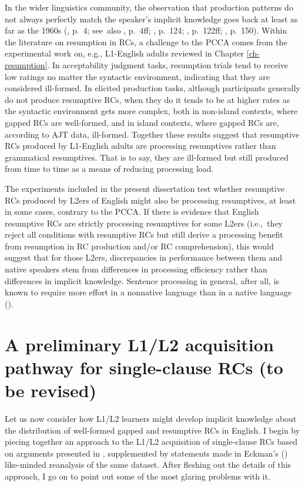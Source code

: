 In the wider linguistics community, the observation that production patterns do not always perfectly match the speaker's implicit knowledge goes back at least as far as the 1960s (\cite{chomsky1965}, p.~4; see~also \cite{kim2016}, p.~4ff; \cite{lust2006}, p.~124; \cite{schwartz1986}, p.~122ff; \cite{schwartz1993}, p.~150). Within the literature on resumption in RCs, a challenge to the PCCA comes from the experimental work on, e.g., L1-English adults reviewed in Chapter \ref{ch-resumption}. In acceptability judgment tasks, resumption trials tend to receive low ratings no matter the syntactic environment, indicating that they are considered ill-formed. In elicited production tasks, although participants generally do not produce resumptive RCs, when they do it tends to be at higher rates as the syntactic environment gets more complex, both in non-island contexts, where gapped RCs are well-formed, and in island contexts, where gapped RCs are, according to AJT data, ill-formed. Together these results suggest that resumptive RCs produced by L1-English adults are processing resumptives rather than grammatical resumptives. That is to say, they are ill-formed but still produced from time to time as a means of reducing processing load. 

The experiments included in the present dissertation test whether resumptive RCs produced by L2ers of English might also be processing resumptives, at least in some cases, contrary to the PCCA. If there is evidence that English resumptive RCs are strictly processing resumptives for some L2ers (i.e.,~they reject all conditions with resumptive RCs but still derive a processing benefit from resumption in RC production and/or RC comprehension), this would suggest that for those L2ers, discrepancies in performance between them and native speakers stem from differences in processing efficiency rather than differences in implicit knowledge. Sentence processing in general, after all, is known to require more effort in a nonnative language than in a native language (\cite{hopp2014,kilborn1992}). 

\section{A preliminary L1/L2 acquisition pathway for single-clause RCs (to be revised)}\label{acq-preliminary}

Let us now consider how L1/L2 learners might develop implicit knowledge about the distribution of well-formed gapped and resumptive RCs in English. I begin by piecing together an approach to the L1/L2 acquisition of single-clause RCs based on arguments presented in \textcite{hyltenstam1984,hyltenstam1990}, supplemented by statements made in Eckman's (\citeyear{eckman2004}) like-minded reanalysis of the same dataset. After fleshing out the details of this approach, I go on to point out some of the most glaring problems with it.

